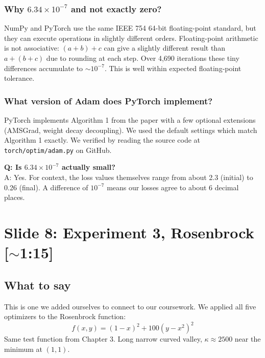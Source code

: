 \documentclass[11pt, letterpaper]{article}
\begin{document}
\begin{deepdive}
\subsubsection{Why $6.34 \times 10^{-7}$ and not exactly zero?}
NumPy and PyTorch use the same IEEE 754 64-bit floating-point standard, but they can execute operations in slightly different orders. Floating-point arithmetic is not associative: $(a + b) + c$ can give a slightly different result than $a + (b + c)$ due to rounding at each step. Over 4,690 iterations these tiny differences accumulate to $\sim 10^{-7}$. This is well within expected floating-point tolerance.

\subsubsection{What version of Adam does PyTorch implement?}
PyTorch implements Algorithm 1 from the paper with a few optional extensions (AMSGrad, weight decay decoupling). We used the default settings which match Algorithm 1 exactly. We verified by reading the source code at \texttt{torch/optim/adam.py} on GitHub.
\end{deepdive}

\begin{qabox}
\textbf{Q: Is $6.34 \times 10^{-7}$ actually small?}\\
A: Yes. For context, the loss values themselves range from about 2.3 (initial) to 0.26 (final). A difference of $10^{-7}$ means our losses agree to about 6 decimal places.
\end{qabox}


\section{Slide 8: Experiment 3, Rosenbrock \textnormal{\color{muted}[$\sim$1:15]}}

\subsection{What to say}

This is one we added ourselves to connect to our coursework. We applied all five optimizers to the Rosenbrock function:
$$f(x,y) = (1-x)^2 + 100(y-x^2)^2$$
Same test function from Chapter 3. Long narrow curved valley, $\kappa \approx 2500$ near the minimum at $(1, 1)$.
\end{document}
